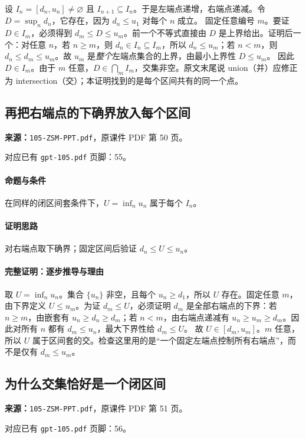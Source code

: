 设 $I_n=[d_n,u_n]\ne\varnothing$ 且 $I_{n+1}\subseteq I_n$。于是左端点递增，右端点递减。令 $D=\sup_n d_n$，它存在，因为 $d_n\le u_1$ 对每个 $n$ 成立。
固定任意编号 $m$。要证 $D\in I_m$，必须得到 $d_m\le D\le u_m$。前一个不等式直接由 $D$ 是上界给出。证明后一个：对任意 $n$，若 $n\ge m$，则 $d_n\in I_n\subseteq I_m$，所以 $d_n\le u_m$；若 $n<m$，则 $d_n\le d_m\le u_m$。故 $u_m$ 是\emph{整个}左端点集合的上界，由最小上界性 $D\le u_m$。
因此 $D\in I_m$。由于 $m$ 任意，$D\in\bigcap_m I_m$，交集非空。原文末尾说 union（并）应修正为 intersection（交）；本证明找到的是每个区间共有的同一个点。

\clearpage\subsection{再把右端点的下确界放入每个区间}
\textbf{来源：}\texttt{105-ZSM-PPT.pdf}，原课件 PDF 第 50 页。\par
对应已有 \texttt{gpt-105.pdf} 页脚：55。\par
\paragraph{命题与条件}在同样的闭区间套条件下，$U=\inf_n u_n$ 属于每个 $I_n$。
\paragraph{证明思路}对右端点取下确界；固定区间后验证 $d_n\le U\le u_n$。
\paragraph{完整证明：逐步推导与理由}

取 $U=\inf_n u_n$。集合 $\{u_n\}$ 非空，且每个 $u_n\ge d_1$，所以 $U$ 存在。固定任意 $m$，由下界定义 $U\le u_m$。为证 $d_m\le U$，必须证明 $d_m$ 是全部右端点的下界：若 $n\ge m$，由嵌套有 $u_n\ge d_n\ge d_m$；若 $n<m$，由右端点递减有 $u_n\ge u_m\ge d_m$。因此对所有 $n$ 都有 $d_m\le u_n$，最大下界性给 $d_m\le U$。
故 $U\in[d_m,u_m]$。$m$ 任意，所以 $U$ 属于区间套的交。检查这里用的是“一个固定左端点控制所有右端点”，而不是仅有 $d_m\le u_m$。

\clearpage\subsection{为什么交集恰好是一个闭区间}
\textbf{来源：}\texttt{105-ZSM-PPT.pdf}，原课件 PDF 第 51 页。\par
对应已有 \texttt{gpt-105.pdf} 页脚：56。\par
